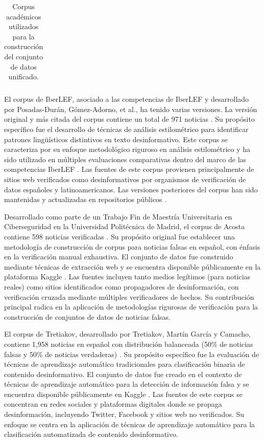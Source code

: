 \begin{table}[htbp]
{\begin{tabular}{|c|l|l|c|c|l|c|}
\hline
\end{tabular}
}
\caption{Corpus académicos utilizados para la construcción del conjunto de datos unificado.}
\label{tab:corpus_academicos}
\end{table}

El corpus de IberLEF, asociado a las competencias de IberLEF y desarrollado por Posadas-Durán, Gómez-Adorno, et al., ha tenido varias versiones. La versión original y más citada del corpus contiene un total de 971 noticias \cite{posadas2019detection}. Su propósito específico fue el desarrollo de técnicas de análisis estilométrico para identificar patrones lingüísticos distintivos en texto desinformativo. Este corpus se caracteriza por su enfoque metodológico riguroso en análisis estilométrico y ha sido utilizado en múltiples evaluaciones comparativas dentro del marco de las competencias IberLEF \cite{gomez2021overview, aragon2020overview}. Las fuentes de este corpus provienen principalmente de sitios web verificados como desinformativos por organismos de verificación de datos españoles y latinoamericanos. Las versiones posteriores del corpus han sido mantenidas y actualizadas en repositorios públicos \cite{ramirez2021spanish}.

Desarrollado como parte de un Trabajo Fin de Maestría Universitaria en Ciberseguridad en la Universidad Politécnica de Madrid, el corpus de Acosta contiene 598 noticias verificadas \cite{acosta2019construccion}. Su propósito original fue establecer una metodología de construcción de corpus para noticias falsas en español, con énfasis en la verificación manual exhaustiva. El conjunto de datos fue construido mediante técnicas de extracción web y se encuentra disponible públicamente en la plataforma Kaggle \cite{acosta2019dataset, zules2019spanish}. Las fuentes incluyen tanto medios legítimos (para noticias reales) como sitios identificados como propagadores de desinformación, con verificación cruzada mediante múltiples verificadores de hechos. Su contribución principal radica en la aplicación de metodologías rigurosas de verificación para la construcción de conjuntos de datos de noticias falsas.

El corpus de Tretiakov, desarrollado por Tretiakov, Martín García y Camacho, contiene 1,958 noticias en español con distribución balanceada (50\% de noticias falsas y 50\% de noticias verdaderas) \cite{tretiakov2022detection}. Su propósito específico fue la evaluación de técnicas de aprendizaje automático tradicionales para clasificación binaria de contenido desinformativo. El conjunto de datos fue creado en el contexto de técnicas de aprendizaje automático para la detección de información falsa y se encuentra disponible públicamente en Kaggle \cite{tretiakov2022noticias}. Las fuentes de este corpus se concentran en redes sociales y plataformas digitales donde se propaga desinformación, incluyendo Twitter, Facebook y sitios web no verificados. Su enfoque se centra en la aplicación de técnicas de aprendizaje automático para la clasificación automatizada de contenido desinformativo.

